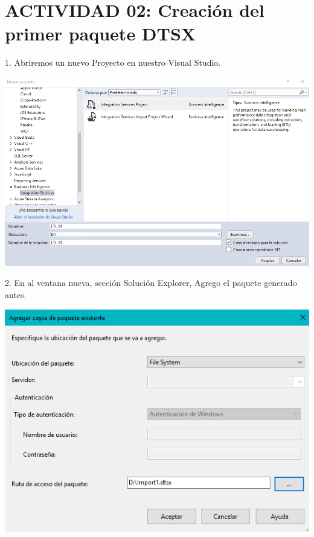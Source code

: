 \section{ACTIVIDAD 02: Creación del primer paquete DTSX} 

1. Abriremos un nuevo Proyecto en nuestro Visual Studio.
	\begin{center}
	\includegraphics[width=\columnwidth]{images/task2/img13}
	\end{center}	

2. En al ventana nueva, sección Solución Explorer, Agrego el paquete generado antes.
	\begin{center}
	\includegraphics[width=\columnwidth]{images/task2/img14}
    \end{center}	
    
